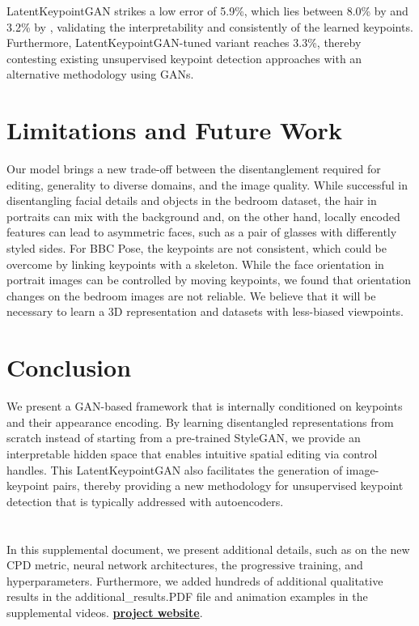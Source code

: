 \documentclass[10pt, conference, compsocconf]{IEEEtran}
\begin{document}
LatentKeypointGAN strikes a low error of 5.9\%, which lies between 8.0\% by \cite{thewlis2017unsupervised} and 3.2\% by \cite{jakab2018unsupervised}, validating the interpretability and consistently of the learned keypoints. Furthermore, LatentKeypointGAN-tuned variant reaches 3.3\%, thereby contesting existing unsupervised keypoint detection approaches with an alternative methodology using GANs. \section{Limitations and Future Work}
\label{sec:limitations}
Our model brings a new trade-off between the disentanglement required for editing, generality to diverse domains, and the image quality. 
While successful in disentangling facial details and objects in the bedroom dataset, the hair in portraits can mix with the background and, on the other hand, locally encoded features can lead to asymmetric faces, such as a pair of glasses with differently styled sides. 
For BBC Pose, the keypoints are not consistent, which could be overcome by linking keypoints with a skeleton.
While the face orientation in portrait images can be controlled by moving keypoints, we found that orientation changes on the bedroom images are not reliable. We believe that it will be necessary to learn a 3D representation and datasets with less-biased viewpoints. 

\section{Conclusion}

We present a GAN-based framework that is internally conditioned on keypoints and their appearance encoding. By learning disentangled representations from scratch instead of starting from a pre-trained StyleGAN, we provide an interpretable hidden space that enables intuitive spatial editing via control handles. 
This LatentKeypointGAN also facilitates the generation of image-keypoint pairs, thereby providing a new methodology for unsupervised keypoint detection that is typically addressed with autoencoders. 
%
 



\appendix
\section*{}
In this supplemental document, we present additional details, such as on the new CPD metric, neural network architectures, the progressive training, and hyperparameters. Furthermore, we added hundreds of additional qualitative results in the additional\_results.PDF file and animation examples in the supplemental videos. 
\textbf{\href{https://xingzhehe.github.io/LatentKeypointGAN/}{project website}}.
\end{document}

